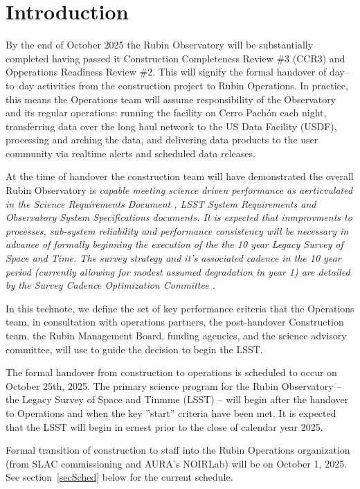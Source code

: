 \section{Introduction}

By the end of October 2025 the Rubin Observatory will be substantially completed having passed it Construction Completeness Review \#3 (CCR3) and Opperations Readiness Review \#2.  This will signify the formal handover of day--to--day activities from the construction project to Rubin Operations. In practice, this means the Operations team \cite[see][]{RDO-018} will assume responsibility of the Observatory and its regular operations: running the facility on Cerro Pach\'{o}n each night, transferring data over the long haul network to the US Data Facility (USDF), processing and arching the data, and delivering data products to the user community via realtime alerts and scheduled data releases. 

At the time of handover the construction team will have demonstrated the overall Rubin Observatory is \it{capable} meeting science driven performance as aerticvulated in the Science Requirements Document \cite{SRD}, LSST System Requirements \cite{LSR} and Observatory System Specifications \cite{OSS} documents.  It is expected that inmprovments to processes, sub-system reliability and performance consistency will be necessary in advance of formally beginning the execution of the the 10 year Legacy Survey of Space and Time. The survey strategy and it's associated cadence in the 10 year period (currently allowing for modest assumed degradation in year 1) are detailed by the Survey Cadence Optimization Committee \cite[SCOC,][]{PSTN-056}. 

In this technote, we define the set of key performance criteria that the Operations team, in consultation with operations partners, the post-handover Construction team, the Rubin Management Board, funding agencies, and the science advisory committee, will use to guide the decision to begin the LSST. 

The formal handover from construction to operations is scheduled to occur on October 25th, 2025. The primary science program for the Rubin Observatory -- the Legacy Survey of Space and Tinmme (LSST) -- will begin after the handover to Operations and when the key ''start'' criteria have been met.  It is expected that the LSST will begin in ernest prior to the close of calendar year 2025.

Formal transition of construction to staff into the Rubin Operations organization (from SLAC commissioning and AURA's NOIRLab) will be on October 1, 2025. See section~\ref{secSched} below for the current schedule.  
